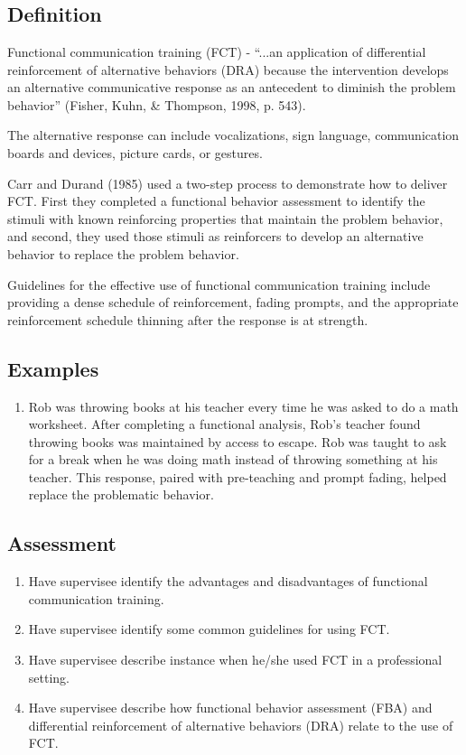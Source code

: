 \clearpage \section{\fourfSeven{}}
\subsection{Definition}
Functional communication training (FCT) - ``...an application of differential reinforcement of alternative behaviors (DRA) because the intervention develops an alternative communicative response as an antecedent to diminish the problem behavior'' (Fisher, Kuhn, \& Thompson, 1998, p. 543).

The alternative response can include vocalizations, sign language, communication boards and devices, picture cards, or gestures.

Carr and Durand (1985) used a two-step process to demonstrate how to deliver FCT.  First they completed a functional behavior assessment to identify the stimuli with known reinforcing properties that maintain the problem behavior, and second, they used those stimuli as reinforcers to develop an alternative behavior to replace the problem behavior.

Guidelines for the effective use of functional communication training include providing a dense schedule of reinforcement, fading prompts, and the appropriate reinforcement schedule thinning after the response is at strength.
%
\subsection{Examples}
\begin{enumerate}
\item Rob was throwing books at his teacher every time he was asked to do a math worksheet. After completing a functional analysis, Rob's teacher found throwing books was maintained by access to escape. Rob was taught to ask for a break when he was doing math instead of throwing something at his teacher. This response, paired with pre-teaching and prompt fading, helped replace the problematic behavior.
\end{enumerate}
%
\subsection{Assessment}
\begin{enumerate}
\item Have supervisee identify the advantages and disadvantages of functional communication training.
\item Have supervisee identify some common guidelines for using FCT.
\item Have supervisee describe instance when he/she used FCT in a professional setting.
\item Have supervisee describe how functional behavior assessment (FBA) and differential reinforcement of alternative behaviors (DRA) relate to the use of FCT.
%
\end{enumerate}
%
